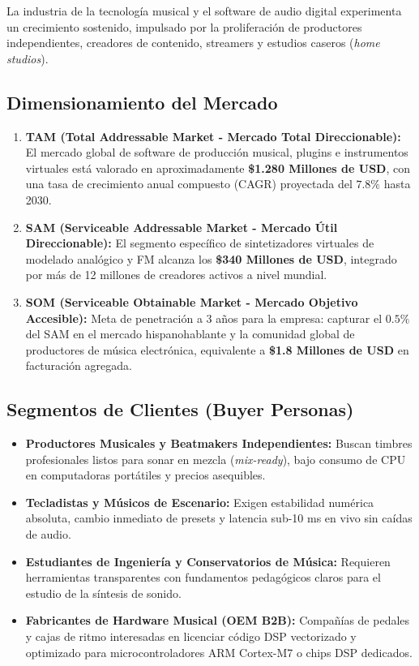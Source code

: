 \documentclass[11pt,a4paper]{article}
\begin{document}
La industria de la tecnología musical y el software de audio digital experimenta un crecimiento sostenido, impulsado por la proliferación de productores independientes, creadores de contenido, streamers y estudios caseros (\textit{home studios}).

\subsection{Dimensionamiento del Mercado}
\begin{enumerate}[leftmargin=1.5cm]
    \item \textbf{TAM (Total Addressable Market - Mercado Total Direccionable):} 
    El mercado global de software de producción musical, plugins e instrumentos virtuales está valorado en aproximadamente \textbf{\$1.280 Millones de USD}, con una tasa de crecimiento anual compuesto (CAGR) proyectada del $7.8\%$ hasta 2030.
    \item \textbf{SAM (Serviceable Addressable Market - Mercado Útil Direccionable):} 
    El segmento específico de sintetizadores virtuales de modelado analógico y FM alcanza los \textbf{\$340 Millones de USD}, integrado por más de 12 millones de creadores activos a nivel mundial.
    \item \textbf{SOM (Serviceable Obtainable Market - Mercado Objetivo Accesible):} 
    Meta de penetración a 3 años para la empresa: capturar el $0.5\%$ del SAM en el mercado hispanohablante y la comunidad global de productores de música electrónica, equivalente a \textbf{\$1.8 Millones de USD} en facturación agregada.
\end{enumerate}

\subsection{Segmentos de Clientes (Buyer Personas)}
\begin{itemize}[leftmargin=1.5cm]
    \item \textbf{Productores Musicales y Beatmakers Independientes:} Buscan timbres profesionales listos para sonar en mezcla (\textit{mix-ready}), bajo consumo de CPU en computadoras portátiles y precios asequibles.
    \item \textbf{Tecladistas y Músicos de Escenario:} Exigen estabilidad numérica absoluta, cambio inmediato de presets y latencia sub-10 ms en vivo sin caídas de audio.
    \item \textbf{Estudiantes de Ingeniería y Conservatorios de Música:} Requieren herramientas transparentes con fundamentos pedagógicos claros para el estudio de la síntesis de sonido.
    \item \textbf{Fabricantes de Hardware Musical (OEM B2B):} Compañías de pedales y cajas de ritmo interesadas en licenciar código DSP vectorizado y optimizado para microcontroladores ARM Cortex-M7 o chips DSP dedicados.
\end{itemize}
\end{document}
